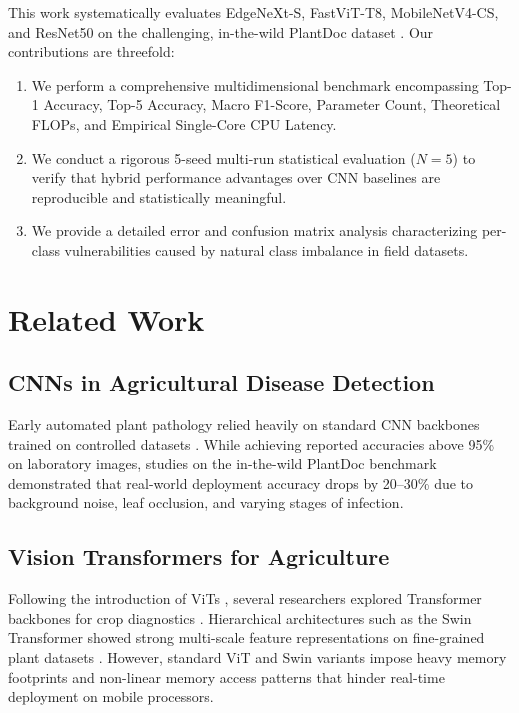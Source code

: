 \documentclass[conference]{IEEEtran}
\begin{document}
This work systematically evaluates EdgeNeXt-S, FastViT-T8, MobileNetV4-CS, and ResNet50 on the challenging, in-the-wild PlantDoc dataset \cite{plantdoc}. Our contributions are threefold:
\begin{enumerate}
    \item We perform a comprehensive multidimensional benchmark encompassing Top-1 Accuracy, Top-5 Accuracy, Macro F1-Score, Parameter Count, Theoretical FLOPs, and Empirical Single-Core CPU Latency.
    \item We conduct a rigorous 5-seed multi-run statistical evaluation ($N=5$) to verify that hybrid performance advantages over CNN baselines are reproducible and statistically meaningful.
    \item We provide a detailed error and confusion matrix analysis characterizing per-class vulnerabilities caused by natural class imbalance in field datasets.
\end{enumerate}

\section{Related Work}

\subsection{CNNs in Agricultural Disease Detection}
Early automated plant pathology relied heavily on standard CNN backbones trained on controlled datasets \cite{plantvillage, efficientnet, mobilenetv1}. While achieving reported accuracies above 95\% on laboratory images, studies on the in-the-wild PlantDoc benchmark \cite{plantdoc} demonstrated that real-world deployment accuracy drops by 20--30\% due to background noise, leaf occlusion, and varying stages of infection.

\subsection{Vision Transformers for Agriculture}
Following the introduction of ViTs \cite{vit}, several researchers explored Transformer backbones for crop diagnostics \cite{thakur2022vitplant, borhani2022deepplant}. Hierarchical architectures such as the Swin Transformer \cite{swin} showed strong multi-scale feature representations on fine-grained plant datasets \cite{plantpath2021}. However, standard ViT and Swin variants impose heavy memory footprints and non-linear memory access patterns that hinder real-time deployment on mobile processors.
\end{document}
